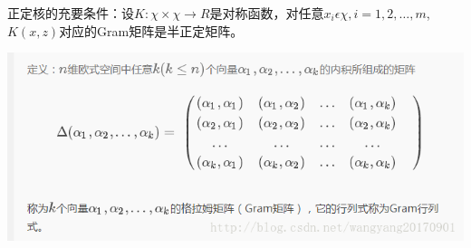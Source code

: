 \documentclass{article}
\begin{document}
	正定核的充要条件：设$K:\chi \times \chi \rightarrow R$是对称函数，对任意$x_{i}\epsilon \chi ,i=1,2,\ldots,m$,$K(x,z)$对应的Gram矩阵是半正定矩阵。
	
	\includegraphics[width=\textwidth]{gram}
\end{document}
